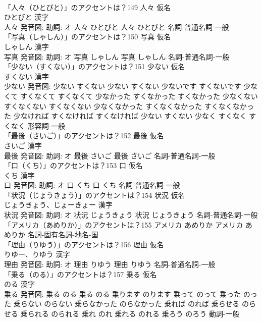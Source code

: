\documentclass[8pt]{extreport}
\begin{document}
\begin{CJK}{UTF8}{min}
\\	「人々（ひとびと）」のアクセントは？149	人々 仮名　
\\	ひとびと 漢字　
\\	人々 発音図: 助詞: オ	人々 ひとびと		人々 ひとびと				名詞-普通名詞-一般 
\\	「写真（しゃしん）」のアクセントは？150	写真 仮名　
\\	しゃしん 漢字　
\\	写真 発音図: 助詞: オ	写真 しゃしん		写真 しゃしん				名詞-普通名詞-一般 
\\	「少ない（すくない）」のアクセントは？151	少ない 仮名　
\\	すくない 漢字　
\\	少ない 発音図:	少ない すくない		少ない すくない 少ないです すくないです 少なくて すくなくて すくなくて 少なかった すくなかった すくなかった 少なくない すくなくない すくなくない 少なくなかった すくなくなかった すくなくなかった 少なければ すくなければ すくなければ 少ない すくない 少なく すくなく すくなく				形容詞-一般 
\\	「最後（さいご）」のアクセントは？152	最後 仮名　
\\	さいご 漢字　
\\	最後 発音図: 助詞: オ	最後 さいご		最後 さいご				名詞-普通名詞-一般 
\\	「口（くち）」のアクセントは？153	口 仮名　
\\	くち 漢字　
\\	口 発音図: 助詞: オ	口 くち		口 くち				名詞-普通名詞-一般 
\\	「状況（じょうきょう）」のアクセントは？154	状況 仮名　
\\	じょうきょう、じょーきょー 漢字　
\\	状況 発音図: 助詞: オ	状況 じょうきょう		状況 じょうきょう				名詞-普通名詞-一般 
\\	「アメリカ（あめりか）」のアクセントは？155		アメリカ あめりか		アメリカ あめりか				名詞-固有名詞-地名-国 
\\	「理由（りゆう）」のアクセントは？156	理由 仮名　
\\	りゆー、りゆう 漢字　
\\	理由 発音図: 助詞: オ	理由 りゆう		理由 りゆう				名詞-普通名詞-一般 
\\	「乗る（のる）」のアクセントは？157	乗る 仮名　
\\	のる 漢字　
\\	乗る 発音図:	乗る のる		乗る のる 乗ります のります 乗って のって 乗った のった 乗らない のらない 乗らなかった のらなかった 乗れば のれば 乗らせる のらせる 乗られる のられる 乗れ のれ 乗れる のれる 乗ろう のろう				動詞-一般 

\end{CJK}
\end{document}
